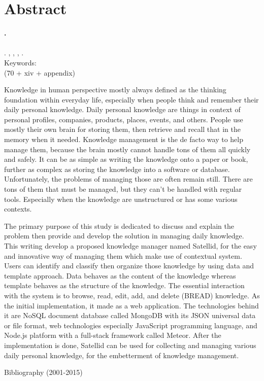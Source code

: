 
\begingroup
\let\clearpage\relax
\let\cleardoublepage\relax

\label{chap:abstract}
\chapter{Abstract}

\textbf{\myName.} \myNPM \\
\textbf{\myTitle} \\
\textbf{\myThesisType}. \myDepartmentLong, \myFacultyLong, \myUni, \myYear. \\
Keywords: \myKeywords \\
(70 + xiv + appendix)

\hfill

\singlespacing

Knowledge in human perspective mostly always defined as the thinking foundation within everyday life,
especially when people think and remember their daily personal knowledge.
Daily personal knowledge are things in context of personal profiles, companies, products, places, events, and others.
People use mostly their own brain for storing them, then retrieve and recall that in the memory when it needed.
Knowledge management is the de facto way to help manage them, because the brain mostly cannot handle tons of them all quickly and safely.
It can be as simple as writing the knowledge onto a paper or book, further as complex as storing the knowledge into a software or database.
Unfortunately, the problems of managing those are often remain still.
There are tons of them that must be managed, but they can’t be handled with regular tools.
Especially when the knowledge are unstructured or has some various contexts.

The primary purpose of this study is dedicated to discuss and explain the problem then provide and develop the solution in managing daily knowledge.
This writing develop a proposed knowledge manager named Satellid, for the easy and innovative way of managing them which make use of contextual system.
Users can identify and classify then organize those knowledge by using data and template approach.
Data behaves as the content of the knowledge whereas template behaves as the structure of the knowledge.
The essential interaction with the system is to browse, read, edit, add, and delete (BREAD) knowledge.
As the initial implementation, it made as a web application.
The technologies behind it are NoSQL document database called MongoDB with its JSON universal data or file format, web technologies especially JavaScript programming language, and Node.js platform with a full-stack framework called Meteor.
After the implementation is done, Satellid can be used for collecting and managing various daily personal knowledge, for the embetterment of knowledge management.

\onehalfspacing

\hfill


\noindent Bibliography (2001-2015)



\endgroup

\vfill
